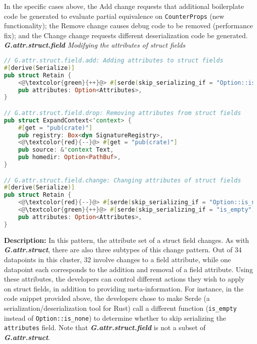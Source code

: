 In the specific cases above, the Add change requests that additional boilerplate code be generated to evaluate partial equivalence on \texttt{CounterProps} (new functionality); the Remove change causes debug code to be removed (performance fix); and the Change change requests different deserialization code be generated. \\

\noindent\textit{\textbf{G.attr.struct.field} Modifying the attributes of struct fields}

\begin{lstlisting}[language=Rust, style=colouredRust]
// G.attr.struct.field.add: Adding attributes to struct fields
#[derive(Serialize)]
pub struct Retain {
    <@\textcolor{green}{++}@> #[serde(skip_serializing_if = "Option::is_none")]
    pub attributes: Option<Attributes>,
}

// G.attr.struct.field.drop: Removing attributes from struct fields
pub struct ExpandContext<'context> {
    #[get = "pub(crate)"]
    pub registry: Box<dyn SignatureRegistry>,
    <@\textcolor{red}{--}@> #[get = "pub(crate)"]
    pub source: &'context Text,
    pub homedir: Option<PathBuf>,
}

// G.attr.struct.field.change: Changing attributes of struct fields
#[derive(Serialize)]
pub struct Retain {
    <@\textcolor{red}{--}@> #[serde(skip_serializing_if = "Option::is_none")]
    <@\textcolor{green}{++}@> #[serde(skip_serializing_if = "is_empty")]
    pub attributes: Option<Attributes>,
}
\end{lstlisting}

\noindent\textbf{Description:} In this pattern, the attribute set of a struct field changes. As with \textit{\textbf{G.attr.struct}}, there are also three subtypes of this change pattern. Out of 34 datapoints in this cluster, 32 involve changes to a field attribute, while one datapoint each corresponds to the addition and removal of a field attribute. Using these attributes, the developers can control different actions they wish to apply on struct fields, in addition to providing meta-information. For instance, in the code snippet provided above, the developers chose to make Serde (a serialization/deserialization tool for Rust) call a different function (\verb+is_empty+ instead of \verb+Option::is_none+) to determine whether to skip serializing the \verb+attributes+ field. Note that \textit{\textbf{G.attr.struct.field}} is not a subset of \textit{\textbf{G.attr.struct}}. \\

